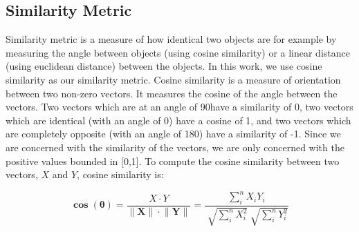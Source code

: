 %
% 
% 

\subsection{Similarity Metric}
Similarity metric is a measure of how identical two objects are for example by measuring the angle between objects (using cosine similarity) or a linear distance (using euclidean distance) between the objects. In this work, we use cosine similarity as our similarity metric. Cosine similarity is a measure of orientation between two non-zero vectors. It measures the cosine of the angle between the vectors. Two vectors which are at an angle of 90\degree  have a similarity of 0, two vectors which are identical (with an angle of 0\degree) have a cosine of 1, and two vectors which are completely opposite (with an angle of 180\degree) have a similarity of -1. Since we are concerned with the similarity of the vectors, we are only concerned with the positive values bounded in [0,1]. To compute the cosine similarity between two vectors, $X$ and $Y$, cosine similarity is:

\[\mathbf{\cos{(\theta)}} = \dfrac{X \cdot  Y}{ \lVert \mathbf{X} \rVert \cdot \lVert \mathbf{Y} \rVert} =\dfrac{\sum_{i}^n X_i Y_i }{\sqrt[]{\sum_{i}^n X_i^2} \sqrt[]{\sum_{i}^n Y_i^2}}  \]

%
%
%
%




